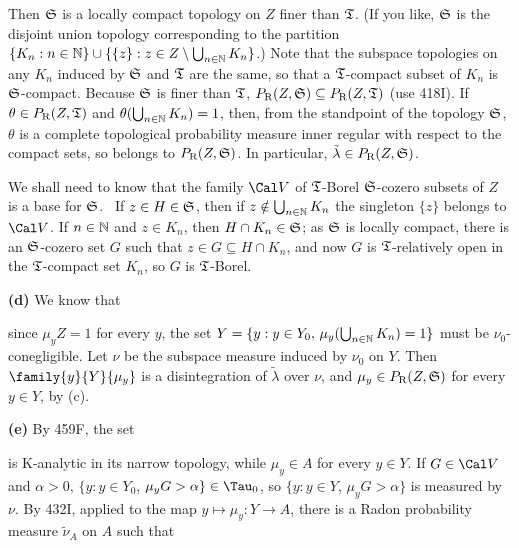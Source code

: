 {\noindent Then $\frak S$ is a locally compact topology on $Z$ finer than
$\frak T$.   (If you like, $\frak S$ is the disjoint union topology
corresponding to the partition
$\{K_n:n\in\Bbb N\}\cup\{\{z\}:z\in Z\setminus\bigcup_{n\in\Bbb N}K_n\}$.)
Note that the subspace topologies on any $K_n$ induced by $\frak S$ and
$\frak T$ are the same, so that a $\frak T$-compact subset of $K_n$ is
$\frak S$-compact.   Because $\frak S$ is finer than $\frak T$,
$P_{\text{R}}(Z,\frak S)\subseteq P_{\text{R}}(Z,\frak T)$ (use 418I).
If $\theta\in P_{\text{R}}(Z,\frak T)$ and
$\theta(\bigcup_{n\in\Bbb N}K_n)=1$,
then, from the standpoint of the topology $\frak S$, $\theta$ is a
complete topological probability
measure inner regular with respect to the compact sets, so belongs to
$P_{\text{R}}(Z,\frak S)$.   In particular,
$\tilde\lambda\in P_{\text{R}}(Z,\frak S)$.

We shall need to know that the family $\Cal V$
of $\frak T$-Borel $\frak S$-cozero subsets of $Z$
is a base for $\frak S$.   \Prf\ If $z\in H\in\frak S$, then if
$z\notin\bigcup_{n\in\Bbb N}K_n$ the singleton $\{z\}$ belongs to
$\Cal V$.   If $n\in\Bbb N$ and $z\in K_n$, then $H\cap K_n\in\frak S$;
as $\frak S$ is locally compact, there is an $\frak S$-cozero set $G$ such
that $z\in G\subseteq H\cap K_n$, and now $G$ is $\frak T$-relatively open
in the $\frak T$-compact set $K_n$, so $G$ is $\frak T$-Borel.\ \QeD\

\medskip

{\bf (d)} We know that


\noindent since $\mu_yZ=1$ for every $y$, the set
$Y=\{y:y\in Y_0,\,\mu_y(\bigcup_{n\in\Bbb N}K_n)=1\}$ must be
$\nu_0$-conegligible.   Let $\nu$ be the subspace measure induced by
$\nu_0$ on $Y$.   Then $\family{y}{Y}{\mu_y}$ is a disintegration of
$\tilde\lambda$ over $\nu$, and $\mu_y\in P_{\text{R}}(Z,\frak S)$ for
every $y\in Y$, by (c).

\medskip

{\bf (e)} By 459F, the set


\noindent is K-analytic in its narrow
topology, while $\mu_y\in A$ for every $y\in Y$.
If $G\in\Cal V$ and $\alpha>0$,
$\{y:y\in Y_0$, $\mu_yG>\alpha\}\in\Tau_0$, so
$\{y:y\in Y$, $\mu_yG>\alpha\}$ is measured by $\nu$.   By 432I,
applied to the map $y\mapsto\mu_y:Y\to A$, there is a
Radon probability measure $\tilde\nu_A$ on $A$ such that

}
